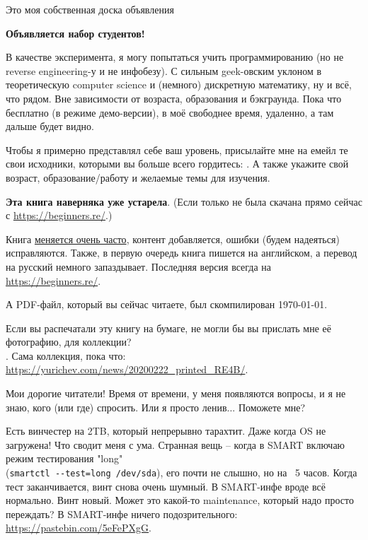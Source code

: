 
\begin{center}
\LARGE{} Это моя собственная доска объявления \normalsize{}
\end{center}

\textbf{Объявляется набор студентов!}

В качестве эксперимента, я могу попытаться учить программированию (но не reverse engineering-у и не инфобезу).
С сильным geek-овским уклоном в теоретическую computer science и (немного) дискретную математику, ну и всё, что рядом.
Вне зависимости от возраста, образования и бэкграунда.
Пока что бесплатно (в режиме демо-версии), в моё свободнее время, удаленно, а там дальше будет видно.

Чтобы я примерно представлял себе ваш уровень, присылайте мне на емейл те свои исходники,
которыми вы больше всего гордитесь: \EMAILS{}.
А также укажите свой возраст, образование/работу и желаемые темы для изучения.

\myhrule{}

\textbf{Эта книга наверняка уже устарела}.
(Если только не была скачана прямо сейчас с \url{https://beginners.re/}.)

Книга \href{\RepoURL/ChangeLog}{меняется очень часто},
контент добавляется, ошибки (будем надеяться) исправляются.
Также, в первую очередь книга пишется на английском, а перевод на русский немного запаздывает.
Последняя версия всегда на \url{https://beginners.re/}.

А PDF-файл, который вы сейчас читаете, был скомпилирован \today{}.

\myhrule{}

Если вы распечатали эту книгу на бумаге, не могли бы вы прислать мне её фотографию, для коллекции?\\
\EMAILS{}.
Сама коллекция, пока что: \url{https://yurichev.com/news/20200222_printed_RE4B/}.

\myhrule{}

Мои дорогие читатели! Время от времени, у меня появляются вопросы, и я не знаю, кого (или где) спросить.
Или я просто ленив...
Поможете мне?

\myhrule{}

Есть винчестер на 2TB, который непрерывно тарахтит.
Даже когда OS не загружена!
Что сводит меня с ума.
Странная вещь -- когда в SMART включаю режим тестирования "long" \\
(\verb|smartctl --test=long /dev/sda|),
его почти не слышно, но на ~5 часов.
Когда тест заканчивается, винт снова очень шумный.
В SMART-инфе вроде всё нормально.
Винт новый.
Может это какой-то maintenance, который надо просто переждать?
В SMART-инфе ничего подозрительного: \url{https://pastebin.com/5eFePXgG}.

